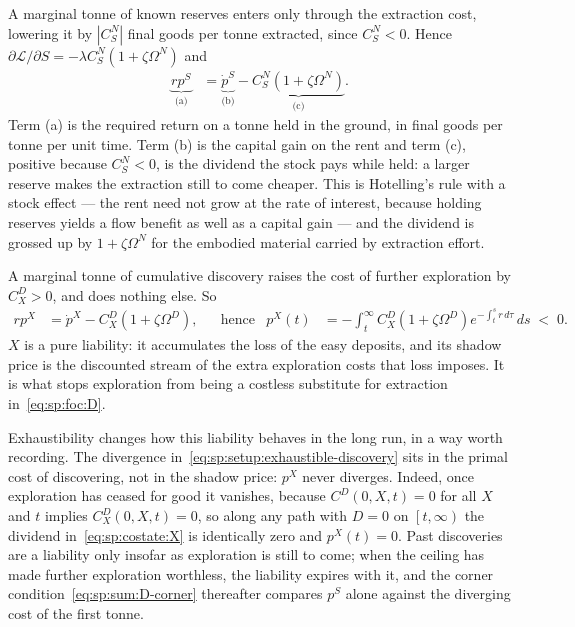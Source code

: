 A marginal tonne of known reserves enters only through the extraction cost, lowering it by $\left|C^N_S\right|$ final goods per tonne extracted, since $C^N_S<0$. Hence $\partial\mathcal L/\partial S=-\lambda C^N_S\left(1+\zeta\Omega^N\right)$ and
\begin{align}
\underbrace{rp^S}_{\text{(a)}} &= \underbrace{\dot p^S}_{\text{(b)}} - \underbrace{C^N_S\left(1+\zeta\Omega^N\right)}_{\text{(c)}} .
\label{eq:sp:costate:S}
\end{align}
Term (a) is the required return on a tonne held in the ground, in final goods per tonne per unit time. Term (b) is the capital gain on the rent and term (c), positive because $C^N_S<0$, is the dividend the stock pays while held: a larger reserve makes the extraction still to come cheaper. This is Hotelling's rule with a stock effect --- the rent need not grow at the rate of interest, because holding reserves yields a flow benefit as well as a capital gain --- and the dividend is grossed up by $1+\zeta\Omega^N$ for the embodied material carried by extraction effort.

 A marginal tonne of cumulative discovery raises the cost of further exploration by $C^D_X>0$, and does nothing else. So
\begin{align}
rp^X &= \dot p^X - C^D_X\left(1+\zeta\Omega^D\right),
&&\text{hence}
&
p^X(t) &= -\int_t^\infty C^D_X\left(1+\zeta\Omega^D\right)e^{-\int_t^s r\,d\tau}\,ds\;<\;0 .
\label{eq:sp:costate:X}
\end{align}
$X$ is a pure liability: it accumulates the loss of the easy deposits, and its shadow price is the discounted stream of the extra exploration costs that loss imposes. It is what stops exploration from being a costless substitute for extraction in~\eqref{eq:sp:foc:D}.

Exhaustibility changes how this liability behaves in the long run, in a way worth recording. The divergence in~\eqref{eq:sp:setup:exhaustible-discovery} sits in the primal cost of discovering, not in the shadow price: $p^X$ never diverges. Indeed, once exploration has ceased for good it vanishes, because $C^D\left(0,X,t\right)=0$ for all $X$ and $t$ implies $C^D_X\left(0,X,t\right)=0$, so along any path with $D=0$ on $\left[t,\infty\right)$ the dividend in~\eqref{eq:sp:costate:X} is identically zero and $p^X\left(t\right)=0$. Past discoveries are a liability only insofar as exploration is still to come; when the ceiling has made further exploration worthless, the liability expires with it, and the corner condition~\eqref{eq:sp:sum:D-corner} thereafter compares $p^S$ alone against the diverging cost of the first tonne.

